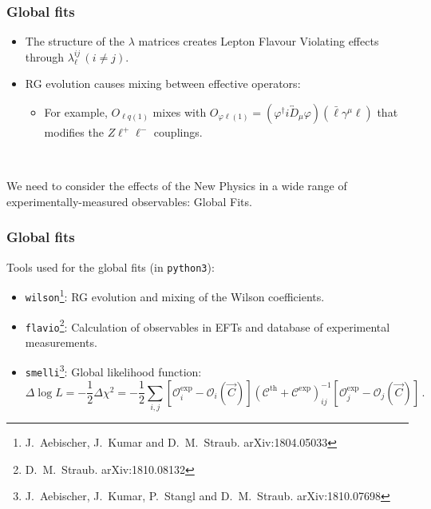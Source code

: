 \documentclass[mathserif, 10pt]{beamer}
\begin{document}
\begin{frame}
    \frametitle{Global fits}
    \begin{itemize}
        \item The structure of the $\lambda$ matrices creates Lepton Flavour Violating effects through $\lambda_\ell^{ij}\, (i\neq j)$.
        \item RG evolution causes mixing between effective operators:
              \begin{itemize}
                  \item For example, $O_{\ell q(1)}$ mixes with $O_{\varphi \ell(1)} = (\varphi^\dagger i \overleftrightarrow D_{\mu} \varphi)(\bar{\ell} \gamma^\mu \ell )$ that modifies the $Z\ell^+\ell^-$ couplings.
              \end{itemize}
    \end{itemize}

    ~

    We need to consider the effects of the New Physics in a wide range of experimentally-measured observables: Global Fits.


\end{frame}

\begin{frame}
    \frametitle{Global fits}

    Tools used for the global fits (in \texttt{python3}):
    \begin{itemize}
        \item \texttt{wilson}\footnote[1]{J.~Aebischer, J.~Kumar and D.~M.~Straub. arXiv:1804.05033}: RG evolution and mixing of the Wilson coefficients.
        \item \texttt{flavio}\footnote[2]{D.~M.~Straub. arXiv:1810.08132}: Calculation of observables in EFTs and database of experimental measurements.
        \item \texttt{smelli}\footnote[3]{J.~Aebischer, J.~Kumar, P.~Stangl and D.~M.~Straub. arXiv:1810.07698}: Global likelihood function:
              {\small$$\Delta \log L = -\frac{1}{2}\Delta\chi^2 = -\frac{1}{2}\sum_{i,j} [\mathcal{O}_i^\mathrm{exp} - \mathcal{O}_i(\vec{C})] (\mathcal{C}^\mathrm{th}+\mathcal{C}^\mathrm{exp})^{-1}_{ij} [\mathcal{O}_j^\mathrm{exp} - \mathcal{O}_j(\vec{C})]\,. $$} %
    \end{itemize}

\end{frame}
\end{document}
